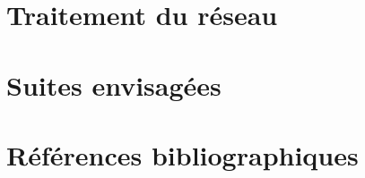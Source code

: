 \documentclass{article}           %
\begin{document}
    
    

\section{Traitement du r\'eseau}

\section{Suites envisag\'ees}

\section{R\'ef\'erences bibliographiques}

\nocite{*}
\printbibliography



\appendix

\printindex
\end{document}
